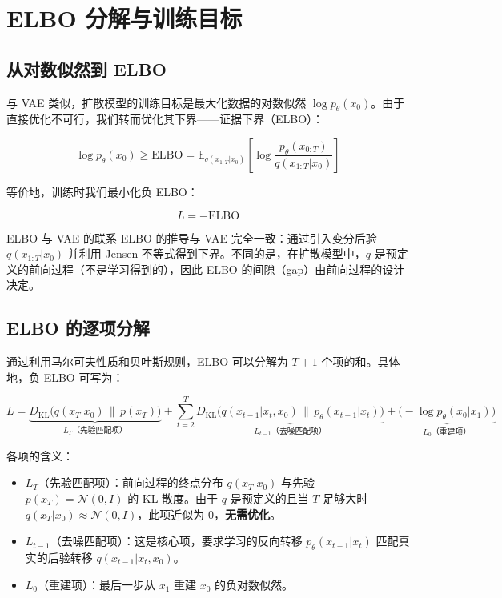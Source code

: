 \section{ELBO 分解与训练目标}

\subsection{从对数似然到 ELBO}

与 VAE 类似，扩散模型的训练目标是最大化数据的对数似然 $\log p_\theta(x_0)$。由于直接优化不可行，我们转而优化其下界——证据下界（ELBO）：

$$\log p_\theta(x_0) \geq \text{ELBO} = \mathbb{E}_{q(x_{1:T}|x_0)}\left[\log \frac{p_\theta(x_{0:T})}{q(x_{1:T}|x_0)}\right]$$

等价地，训练时我们最小化负 ELBO：

$$L = -\text{ELBO}$$

\begin{knowledgebox}{ELBO 与 VAE 的联系}
ELBO 的推导与 VAE 完全一致：通过引入变分后验 $q(x_{1:T}|x_0)$ 并利用 Jensen 不等式得到下界。不同的是，在扩散模型中，$q$ 是预定义的前向过程（不是学习得到的），因此 ELBO 的间隙（gap）由前向过程的设计决定。
\end{knowledgebox}

\subsection{ELBO 的逐项分解}

通过利用马尔可夫性质和贝叶斯规则，ELBO 可以分解为 $T+1$ 个项的和。具体地，负 ELBO 可写为：

$$L = \underbrace{D_{\text{KL}}\big(q(x_T|x_0) \,\|\, p(x_T)\big)}_{L_T\text{（先验匹配项）}} + \sum_{t=2}^{T} \underbrace{D_{\text{KL}}\big(q(x_{t-1}|x_t, x_0) \,\|\, p_\theta(x_{t-1}|x_t)\big)}_{L_{t-1}\text{（去噪匹配项）}} + \underbrace{\big(-\log p_\theta(x_0|x_1)\big)}_{L_0\text{（重建项）}}$$

各项的含义：
\begin{itemize}
    \item $L_T$（先验匹配项）：前向过程的终点分布 $q(x_T|x_0)$ 与先验 $p(x_T) = \mathcal{N}(0,I)$ 的 KL 散度。由于 $q$ 是预定义的且当 $T$ 足够大时 $q(x_T|x_0) \approx \mathcal{N}(0,I)$，此项近似为 0，\textbf{无需优化}。
    \item $L_{t-1}$（去噪匹配项）：这是核心项，要求学习的反向转移 $p_\theta(x_{t-1}|x_t)$ 匹配真实的后验转移 $q(x_{t-1}|x_t, x_0)$。
    \item $L_0$（重建项）：最后一步从 $x_1$ 重建 $x_0$ 的负对数似然。
\end{itemize}

